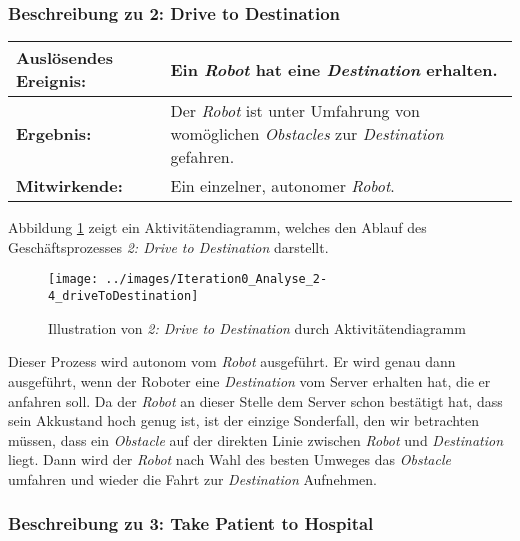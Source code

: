 			\subsubsection*{Beschreibung zu 2: Drive to Destination}

			\begin{table}[H]
				\centering
				\begin{tabularx}{\textwidth}{@{}p{3cm}X@{}}
				\toprule
				\textbf{Auslösendes Ereignis:} & Ein \emph{Robot} hat eine \emph{Destination} erhalten.\\ \midrule
				\textbf{Ergebnis:} & Der \emph{Robot} ist unter Umfahrung von womöglichen \emph{Obstacles} zur \emph{Destination} gefahren.\\ \midrule
				\textbf{Mitwirkende:} &	Ein einzelner, autonomer \emph{Robot}. \\
				\bottomrule
				\end{tabularx}
				\label{tab:2-4-drive-to-destination}
			\end{table}

			Abbildung \ref{fig:2-4-drive-to-destination-aktivitaetendiagramm} zeigt ein Aktivitätendiagramm, welches den Ablauf des Geschäftsprozesses \emph{2: Drive to Destination} darstellt.

			\begin{figure}[H]
				\centering
				\texttt{[image: ../images/Iteration0\_Analyse\_2-4\_driveToDestination]}
				\caption{Illustration von \emph{2: Drive to Destination} durch Aktivitätendiagramm}
				\label{fig:2-4-drive-to-destination-aktivitaetendiagramm}
			\end{figure}

			Dieser Prozess wird autonom vom \emph{Robot} ausgeführt. Er wird genau
			dann ausgeführt, wenn der Roboter eine \emph{Destination} vom Server
			erhalten hat, die er anfahren soll. Da der \emph{Robot} an dieser Stelle
			dem Server schon bestätigt hat, dass sein Akkustand hoch genug ist, ist
			der einzige Sonderfall, den wir betrachten müssen, dass ein
			\emph{Obstacle} auf der direkten Linie zwischen \emph{Robot} und
			\emph{Destination} liegt. Dann wird der \emph{Robot} nach Wahl des
			besten Umweges das \emph{Obstacle} umfahren und wieder die Fahrt zur
			\emph{Destination} Aufnehmen.



			\subsubsection*{Beschreibung zu 3: Take Patient to Hospital}

